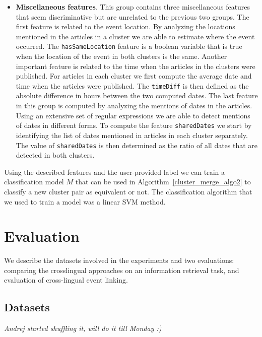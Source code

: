 \documentclass[twoside,11pt]{article}
\begin{document}
\begin{itemize}
\item {\bf Miscellaneous features}. This group contains three miscellaneous features that seem discriminative but are unrelated to the previous two groups. The first feature is related to the event location. By analyzing the locations mentioned in the articles in a cluster we are able to estimate where the event occurred. The \texttt{hasSameLocation} feature is a boolean variable that is true when the location of the event in both clusters is the same. Another important feature is related to the time when the articles in the clusters were published. For articles in each cluster we first compute the average date and time when the articles were published. The \texttt{timeDiff} is then defined as the absolute difference in hours between the two computed dates. The last feature in this group is computed by analyzing the mentions of dates in the articles. Using an extensive set of regular expressions we are able to detect mentions of dates in different forms. To compute the feature \texttt{sharedDates} we start by identifying the list of dates mentioned in articles in each cluster separately. The value of \texttt{sharedDates} is then determined as the ratio of all dates that are detected in both clusters.

\end{itemize}

Using the described features and the user-provided label we can train a classification model $M$ that can be used in Algorithm~\ref{cluster_merge_algo2} to classify a new cluster pair as equivalent or not. The classification algorithm that we used to train a model was a linear SVM method.




\section{Evaluation}

We describe the datasets involved in the experiments and two evaluations: comparing the crosslingual approaches on an information retrieval task, and evaluation of cross-lingual event linking.

\subsection{Datasets}
\emph{Andrej started shuffling it, will do it till Monday :) }
\end{document}
